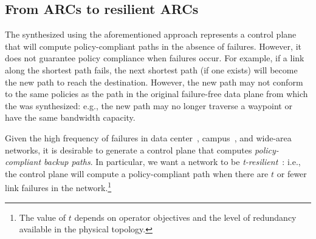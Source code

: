 \subsection{From ARCs to resilient ARCs}

%

The \ARC synthesized using the aforementioned approach represents a control
plane that will compute policy-compliant paths in the absence of failures.
However, it does not guarantee policy compliance when failures occur. For
example, if a link along the shortest path fails, the next shortest path (if
one exists) will become the new path to reach the destination. However, the
new path may not conform to the same policies as the path in the original
failure-free data plane from which the \ARC was synthesized: e.g., the new
path may no longer traverse a waypoint or have the same bandwidth capacity.

Given the high frequency of failures in data center~\cite{datacenterfailures},
campus~\cite{TODO}, and wide-area~\cite{TODO} networks, it is desirable to
generate a control plane that computes {\em policy-compliant backup paths}.
In particular, we want a network to be {\em t-resilient}~\cite{plinko}: i.e.,
the control plane will compute a policy-compliant path when there are $t$ or
fewer link failures in the network.\footnote{The value of $t$ depends on
operator objectives and the level of redundancy available in the physical
topology.} 


